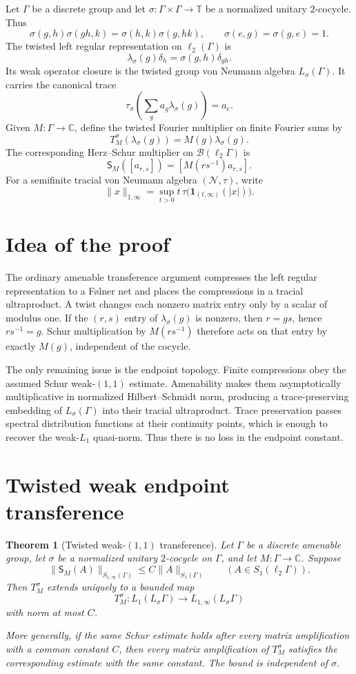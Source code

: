 \documentclass[11pt]{article}
\newtheorem{theorem}{Theorem}[section]
\theoremstyle{remark}
\newcommand{\C}{\mathbb C}
\newcommand{\N}{\mathcal N}
\newcommand{\one}{\mathbf 1}
\begin{document}
Let $\Gamma$ be a discrete group and let
$\sigma:\Gamma\times\Gamma\to\mathbb T$ be a normalized unitary
$2$-cocycle. Thus
\[
 \sigma(g,h)\sigma(gh,k)=\sigma(h,k)\sigma(g,hk),
 \qquad \sigma(e,g)=\sigma(g,e)=1.
\]
The twisted left regular representation on $\ell_2(\Gamma)$ is
\[
 \lambda_\sigma(g)\delta_h=\sigma(g,h)\delta_{gh}.
\]
Its weak operator closure is the twisted group von Neumann algebra
$L_\sigma(\Gamma)$. It carries the canonical trace
\[
 \tau_\sigma\!\left(\sum_g a_g\lambda_\sigma(g)\right)=a_e.
\]
Given $M:\Gamma\to\C$, define the twisted Fourier multiplier on finite
Fourier sums by
\[
 T_M^\sigma(\lambda_\sigma(g))=M(g)\lambda_\sigma(g).
\]
The corresponding Herz--Schur multiplier on
$\mathcal B(\ell_2\Gamma)$ is
\[
 \mathsf S_M([a_{r,s}])=[M(rs^{-1})a_{r,s}].
\]
For a semifinite tracial von Neumann algebra $(\N,\tau)$, write
\[
 \|x\|_{1,\infty}
 =\sup_{t>0} t\,\tau\big(\one_{(t,\infty)}(|x|)\big).
\]

\section{Idea of the proof}

The ordinary amenable transference argument compresses the left regular
representation to a F\o lner net and places the compressions in a tracial
ultraproduct. A twist changes each nonzero matrix entry only by a scalar of
modulus one. If the $(r,s)$ entry of $\lambda_\sigma(g)$ is nonzero, then
$r=gs$, hence $rs^{-1}=g$. Schur multiplication by $M(rs^{-1})$ therefore
acts on that entry by exactly $M(g)$, independent of the cocycle.

The only remaining issue is the endpoint topology. Finite compressions obey
the assumed Schur weak-$(1,1)$ estimate. Amenability makes them
asymptotically multiplicative in normalized Hilbert--Schmidt norm, producing
a trace-preserving embedding of $L_\sigma(\Gamma)$ into their tracial
ultraproduct. Trace preservation passes spectral distribution functions at
their continuity points, which is enough to recover the weak-$L_1$
quasi-norm. Thus there is no loss in the endpoint constant.

\section{Twisted weak endpoint transference}

\begin{theorem}[Twisted weak-$(1,1)$ transference]\label{thm:transfer}
Let $\Gamma$ be a discrete amenable group, let $\sigma$ be a normalized
unitary $2$-cocycle on $\Gamma$, and let $M:\Gamma\to\C$. Suppose
\[
 \|\mathsf S_M(A)\|_{S_{1,\infty}(\Gamma)}
 \le C\|A\|_{S_1(\Gamma)}
 \qquad(A\in S_1(\ell_2\Gamma)).
\]
Then $T_M^\sigma$ extends uniquely to a bounded map
\[
 T_M^\sigma:L_1(L_\sigma\Gamma)\longrightarrow
 L_{1,\infty}(L_\sigma\Gamma)
\]
with norm at most $C$.

More generally, if the same Schur estimate holds after every matrix
amplification with a common constant $C$, then every matrix amplification of
$T_M^\sigma$ satisfies the corresponding estimate with the same constant.
The bound is independent of $\sigma$.
\end{theorem}
\end{document}
